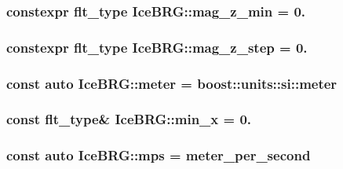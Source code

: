 \hypertarget{namespaceIceBRG_ad984585cf2116d7dba1d297d6fa7d3f1}{
\subsubsection[{mag\-\_\-z\-\_\-min}]{\setlength{\rightskip}{0pt plus 5cm}constexpr {\bf flt\-\_\-type} Ice\-B\-R\-G\-::mag\-\_\-z\-\_\-min = 0.}}\label{namespaceIceBRG_ad984585cf2116d7dba1d297d6fa7d3f1}
\hypertarget{namespaceIceBRG_a1394dcf9ab9fe4a99d8315787e81a2eb}{
\subsubsection[{mag\-\_\-z\-\_\-step}]{\setlength{\rightskip}{0pt plus 5cm}constexpr {\bf flt\-\_\-type} Ice\-B\-R\-G\-::mag\-\_\-z\-\_\-step = 0.}}\label{namespaceIceBRG_a1394dcf9ab9fe4a99d8315787e81a2eb}
\hypertarget{namespaceIceBRG_aa73b527a69b3a11b2dcb1d5c1b1d5ef1}{
\subsubsection[{meter}]{\setlength{\rightskip}{0pt plus 5cm}const auto Ice\-B\-R\-G\-::meter = boost\-::units\-::si\-::meter}}\label{namespaceIceBRG_aa73b527a69b3a11b2dcb1d5c1b1d5ef1}
\hypertarget{namespaceIceBRG_a2669894c97834b30c36e7a378a161fda}{
\subsubsection[{min\-\_\-x}]{\setlength{\rightskip}{0pt plus 5cm}const {\bf flt\-\_\-type}\& Ice\-B\-R\-G\-::min\-\_\-x = 0.}}\label{namespaceIceBRG_a2669894c97834b30c36e7a378a161fda}
\hypertarget{namespaceIceBRG_ad5f22cbf0896ee33ad84e89b40c7c065}{
\subsubsection[{mps}]{\setlength{\rightskip}{0pt plus 5cm}const auto Ice\-B\-R\-G\-::mps = {\bf meter\-\_\-per\-\_\-second}}}\label{namespaceIceBRG_ad5f22cbf0896ee33ad84e89b40c7c065}
